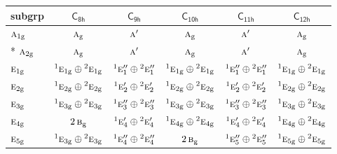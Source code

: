 \documentclass[10pt,a4paper]{article}
\numberwithin{equation}{section}
\newcommand{\grp}[1]{\mathsf{#1}}
\newcommand{\irr}[1]{\text{\normalfont\scshape #1}}
\newcommand{\conjpair}[1]{{}^{#1}}
\newcommand{\ptag}[1]{\mathrm{#1}}
\begin{document}
{\small\begin{longtable}{@{}lccccc@{}}\toprule
subgrp & \href{C8h.pdf}{$\grp{C_{8h}}$} & \href{C9h.pdf}{$\grp{C_{9h}}$} & \href{C10h.pdf}{$\grp{C_{10h}}$} & \href{C11h.pdf}{$\grp{C_{11h}}$} & \href{C12h.pdf}{$\grp{C_{12h}}$}\\\midrule\endhead
\bottomrule\endfoot\endlastfoot
$\irr{a}_{1\ptag{g}}$ & $\irr{a}_{\ptag{g}}$ & $\irr{a}'$ & $\irr{a}_{\ptag{g}}$ & $\irr{a}'$ & $\irr{a}_{\ptag{g}}$\\*
$\irr{a}_{2\ptag{g}}$ & $\irr{a}_{\ptag{g}}$ & $\irr{a}'$ & $\irr{a}_{\ptag{g}}$ & $\irr{a}'$ & $\irr{a}_{\ptag{g}}$\\
$\irr{e}_{1\ptag{g}}$ & $\conjpair{1}\irr{e}_{1\ptag{g}}\oplus \conjpair{2}\irr{e}_{1\ptag{g}}$ & $\conjpair{1}\irr{e}_{1}''\oplus \conjpair{2}\irr{e}_{1}''$ & $\conjpair{1}\irr{e}_{1\ptag{g}}\oplus \conjpair{2}\irr{e}_{1\ptag{g}}$ & $\conjpair{1}\irr{e}_{1}''\oplus \conjpair{2}\irr{e}_{1}''$ & $\conjpair{1}\irr{e}_{1\ptag{g}}\oplus \conjpair{2}\irr{e}_{1\ptag{g}}$\\
$\irr{e}_{2\ptag{g}}$ & $\conjpair{1}\irr{e}_{2\ptag{g}}\oplus \conjpair{2}\irr{e}_{2\ptag{g}}$ & $\conjpair{1}\irr{e}_{2}'\oplus \conjpair{2}\irr{e}_{2}'$ & $\conjpair{1}\irr{e}_{2\ptag{g}}\oplus \conjpair{2}\irr{e}_{2\ptag{g}}$ & $\conjpair{1}\irr{e}_{2}'\oplus \conjpair{2}\irr{e}_{2}'$ & $\conjpair{1}\irr{e}_{2\ptag{g}}\oplus \conjpair{2}\irr{e}_{2\ptag{g}}$\\
$\irr{e}_{3\ptag{g}}$ & $\conjpair{1}\irr{e}_{3\ptag{g}}\oplus \conjpair{2}\irr{e}_{3\ptag{g}}$ & $\conjpair{1}\irr{e}_{3}''\oplus \conjpair{2}\irr{e}_{3}''$ & $\conjpair{1}\irr{e}_{3\ptag{g}}\oplus \conjpair{2}\irr{e}_{3\ptag{g}}$ & $\conjpair{1}\irr{e}_{3}''\oplus \conjpair{2}\irr{e}_{3}''$ & $\conjpair{1}\irr{e}_{3\ptag{g}}\oplus \conjpair{2}\irr{e}_{3\ptag{g}}$\\
$\irr{e}_{4\ptag{g}}$ & $2\,\irr{b}_{\ptag{g}}$ & $\conjpair{1}\irr{e}_{4}'\oplus \conjpair{2}\irr{e}_{4}'$ & $\conjpair{1}\irr{e}_{4\ptag{g}}\oplus \conjpair{2}\irr{e}_{4\ptag{g}}$ & $\conjpair{1}\irr{e}_{4}'\oplus \conjpair{2}\irr{e}_{4}'$ & $\conjpair{1}\irr{e}_{4\ptag{g}}\oplus \conjpair{2}\irr{e}_{4\ptag{g}}$\\
$\irr{e}_{5\ptag{g}}$ & $\conjpair{1}\irr{e}_{3\ptag{g}}\oplus \conjpair{2}\irr{e}_{3\ptag{g}}$ & $\conjpair{1}\irr{e}_{4}''\oplus \conjpair{2}\irr{e}_{4}''$ & $2\,\irr{b}_{\ptag{g}}$ & $\conjpair{1}\irr{e}_{5}''\oplus \conjpair{2}\irr{e}_{5}''$ & $\conjpair{1}\irr{e}_{5\ptag{g}}\oplus \conjpair{2}\irr{e}_{5\ptag{g}}$\\

\end{longtable}}
\end{document}
